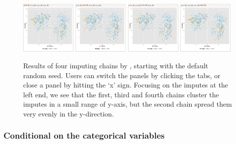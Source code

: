 \documentclass[article]{jss}
\begin{document}
\begin{center}
\begin{figure}[h]
\begin{centering}
\includegraphics[width=0.24\textwidth]{graph/fig10-1-chain}
\includegraphics[width=0.24\textwidth]{graph/fig10-2-chain}
\includegraphics[width=0.24\textwidth]{graph/fig10-3-chain}
\includegraphics[width=0.24\textwidth]{graph/fig10-4-chain}
\par\end{centering}
\caption{Results of four imputing chains by , starting with the default random seed. Users can switch the panels by clicking the tabs, or close a panel by hitting the `x' sign. Focusing on the imputes at the left end, we see that the first, third and fourth chains cluster the imputes in a small range of y-axis, but the second chain spread them very evenly in the y-direction.}
\label{fig:chaintabs}
\end{figure}
\par\end{center}

\subsubsection{Conditional on the categorical variables}
\end{document}
